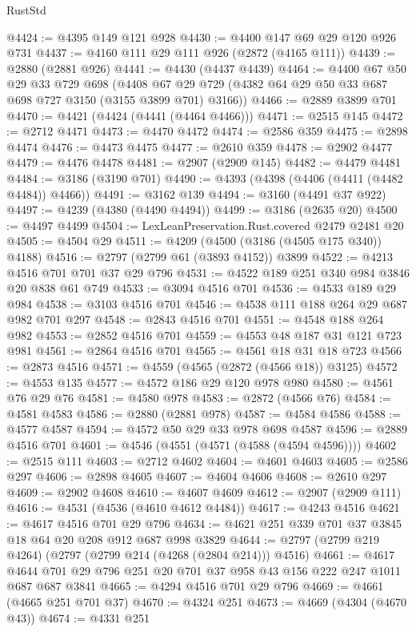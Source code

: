 \begin{lexlean}{RustStd}
\begin{coremodule}
@4424 := @4395 @149 @121 @928
@4430 := @4400 @147 @69 @29 @120 @926 @731
@4437 := @4160 @111 @29 @111 @926 (@2872 (@4165 @111))
@4439 := @2880 (@2881 @926)
@4441 := @4430 (@4437 @4439)
@4464 := @4400
    @67
    @50
    @29
    @33
    @729
    @698
    (@4408 @67 @29 @729 (@4382 @64 @29 @50 @33 @687 @698 @727 @3150 (@3155 @3899 @701) @3166))
@4466 := @2889 @3899 @701
@4470 := @4421 (@4424 (@4441 (@4464 @4466)))
@4471 := @2515 @145
@4472 := @2712 @4471
@4473 := @4470 @4472
@4474 := @2586 @359
@4475 := @2898 @4474
@4476 := @4473 @4475
@4477 := @2610 @359
@4478 := @2902 @4477
@4479 := @4476 @4478
@4481 := @2907 (@2909 @145)
@4482 := @4479 @4481
@4484 := @3186 (@3190 @701)
@4490 := @4393 (@4398 (@4406 (@4411 (@4482 @4484)) @4466))
@4491 := @3162 @139
@4494 := @3160 (@4491 @37 @922)
@4497 := @4239 (@4380 (@4490 @4494))
@4499 := @3186 (@2635 @20)
@4500 := @4497 @4499
@4504 := LexLeanPreservation.Rust.covered @2479 @2481 @20
@4505 := @4504 @29
@4511 := @4209 (@4500 (@3186 (@4505 @175 @340)) @4188)
@4516 := @2797 (@2799 @61 (@3893 @4152)) @3899
@4522 := @4213 @4516 @701 @701 @37 @29 @796
@4531 := @4522 @189 @251 @340 @984 @3846 @20 @838 @61 @749
@4533 := @3094 @4516 @701
@4536 := @4533 @189 @29 @984
@4538 := @3103 @4516 @701
@4546 := @4538 @111 @188 @264 @29 @687 @982 @701 @297
@4548 := @2843 @4516 @701
@4551 := @4548 @188 @264 @982
@4553 := @2852 @4516 @701
@4559 := @4553 @48 @187 @31 @121 @723 @981
@4561 := @2864 @4516 @701
@4565 := @4561 @18 @31 @18 @723
@4566 := @2873 @4516
@4571 := @4559 (@4565 (@2872 (@4566 @18)) @3125)
@4572 := @4553 @135
@4577 := @4572 @186 @29 @120 @978 @980
@4580 := @4561 @76 @29 @76
@4581 := @4580 @978
@4583 := @2872 (@4566 @76)
@4584 := @4581 @4583
@4586 := @2880 (@2881 @978)
@4587 := @4584 @4586
@4588 := @4577 @4587
@4594 := @4572 @50 @29 @33 @978 @698 @4587
@4596 := @2889 @4516 @701
@4601 := @4546 (@4551 (@4571 (@4588 (@4594 @4596))))
@4602 := @2515 @111
@4603 := @2712 @4602
@4604 := @4601 @4603
@4605 := @2586 @297
@4606 := @2898 @4605
@4607 := @4604 @4606
@4608 := @2610 @297
@4609 := @2902 @4608
@4610 := @4607 @4609
@4612 := @2907 (@2909 @111)
@4616 := @4531 (@4536 (@4610 @4612 @4484))
@4617 := @4243 @4516
@4621 := @4617 @4516 @701 @29 @796
@4634 := @4621 @251 @339 @701 @37 @3845 @18 @64 @20 @208 @912 @687 @998 @3829
@4644 := @2797 (@2799 @219 @4264) (@2797 (@2799 @214 (@4268 (@2804 @214))) @4516)
@4661 := @4617 @4644 @701 @29 @796 @251 @20 @701 @37 @958 @43 @156 @222 @247 @1011 @687 @687 @3841
@4665 := @4294 @4516 @701 @29 @796
@4669 := @4661 (@4665 @251 @701 @37)
@4670 := @4324 @251
@4673 := @4669 (@4304 (@4670 @43))
@4674 := @4331 @251

\end{coremodule}
\end{lexlean}
